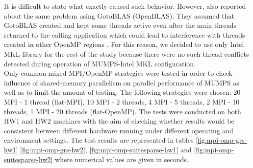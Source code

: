 It is difficult to state what exactly caused such behavior. However, \citeauthor{chowdhury2010some} also reported about the same problem using GotoBLAS (OpenBLAS). They assumed that GotoBLAS created and kept some threads active even after the main threads returned to the calling application which could lead to interference with threads created in other OpenMP regions \cite{chowdhury2010some}. For this reason, we decided to use only Intel MKL library for the rest of the study because there were no such thread-conflicts detected during operation of MUMPS-Intel MKL configuration.\\


Only common mixed MPI/OpenMP strategies were tested in order to check influence of shared-memory parallelism on parallel performance of MUMPS as well as to limit the amount of testing. The following strategies were chosen: 20 MPI - 1 thread (flat-MPI), 10 MPI - 2 threads, 4 MPI - 5 threads, 2 MPI - 10 threads, 1 MPI - 20 threads (flat-OpenMP). The tests were conducted on both HW1 and HW2 machines with the aim of checking whether  results would be consistent between different hardware running under different operating and environment settings. The test results are represented in tables \ref{fig:mpi-omp-grs-hw1} \ref{fig:mpi-omp-grs-hw2}, \ref{fig:mpi-omp-suitesparse-hw1} and \ref{fig:mpi-omp-suitesparse-hw2} where numerical values are given in seconds.\\


